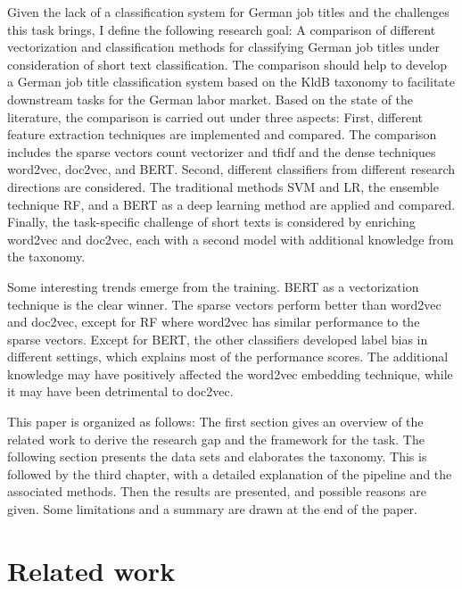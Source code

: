 \documentclass[12pt, a4paper, titlepage]{article}
\begin{document}
Given the lack of a classification system for German job titles and the challenges this task brings, I define the following research goal: A comparison of different vectorization and classification methods for classifying German job titles under consideration of short text classification. The comparison should help to develop a German job title classification system based on the \ac{KldB} taxonomy to facilitate downstream tasks for the German labor market. Based on the state of the literature, the comparison is carried out under three aspects: First, different feature extraction techniques are implemented and compared. The comparison includes the sparse vectors count vectorizer and tfidf and the dense techniques word2vec, doc2vec, and BERT. Second, different classifiers from different research directions are considered. The traditional methods SVM and LR, the ensemble technique RF, and a BERT as a deep learning method are applied and compared. Finally, the task-specific challenge of short texts is considered by enriching word2vec and doc2vec, each with a second model with additional knowledge from the taxonomy. 

Some interesting trends emerge from the training. \ac{BERT} as a vectorization technique is the clear winner. The sparse vectors perform better than word2vec and doc2vec, except for \ac{RF} where word2vec has similar performance to the sparse vectors. Except for \ac{BERT}, the other classifiers developed label bias in different settings, which explains most of the performance scores. The additional knowledge may have positively affected the word2vec embedding technique, while it may have been detrimental to doc2vec. 

This paper is organized as follows: The first section gives an overview of the related work to derive the research gap and the framework for the task. The following section presents the data sets and elaborates the taxonomy. This is followed by the third chapter, with a detailed explanation of the pipeline and the associated methods. Then the results are presented, and possible reasons are given. Some limitations and a summary are drawn at the end of the paper.  

\section{Related work}
\end{document}

